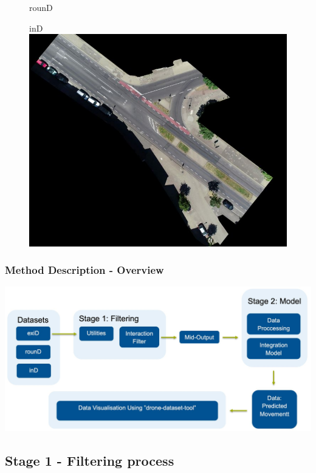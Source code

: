 \begin{frame}
\begin{figure}[!t]
\begin{minipage}[h]{0.32\linewidth}
\begin{block}{rounD}
        \end{block}
    \end{minipage}
    \begin{minipage}[h]{0.32\linewidth}
        \begin{block}{inD}
            \centering
            \includegraphics[width=\textwidth]{figures/pictures_first_part/inD.jpeg}
        \end{block}
    \end{minipage}
  \end{figure}
\end{frame}

\begin{frame}
  \frametitle{Method Description - Overview}
    \includegraphics[width=\textwidth]{figures/pictures_first_part/method_overview.jpeg}
\end{frame}

\subsection{Stage 1 - Filtering process}

